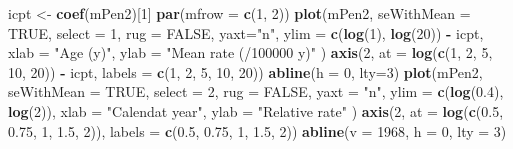 \documentclass[
]{book}
\newenvironment{Shaded}{\begin{snugshade}}{\end{snugshade}}
\newcommand{\AttributeTok}[1]{\textcolor[rgb]{0.13,0.29,0.53}{#1}}
\newcommand{\ConstantTok}[1]{\textcolor[rgb]{0.56,0.35,0.01}{#1}}
\newcommand{\DecValTok}[1]{\textcolor[rgb]{0.00,0.00,0.81}{#1}}
\newcommand{\FloatTok}[1]{\textcolor[rgb]{0.00,0.00,0.81}{#1}}
\newcommand{\FunctionTok}[1]{\textcolor[rgb]{0.13,0.29,0.53}{\textbf{#1}}}
\newcommand{\NormalTok}[1]{#1}
\newcommand{\OtherTok}[1]{\textcolor[rgb]{0.56,0.35,0.01}{#1}}
\newcommand{\SpecialCharTok}[1]{\textcolor[rgb]{0.81,0.36,0.00}{\textbf{#1}}}
\newcommand{\StringTok}[1]{\textcolor[rgb]{0.31,0.60,0.02}{#1}}
\begin{document}
\begin{Shaded}
\begin{Highlighting}[]
\NormalTok{icpt }\OtherTok{\textless{}{-}} \FunctionTok{coef}\NormalTok{(mPen2)[}\DecValTok{1}\NormalTok{]}
\FunctionTok{par}\NormalTok{(}\AttributeTok{mfrow =} \FunctionTok{c}\NormalTok{(}\DecValTok{1}\NormalTok{, }\DecValTok{2}\NormalTok{))}
\FunctionTok{plot}\NormalTok{(mPen2, }
  \AttributeTok{seWithMean =} \ConstantTok{TRUE}\NormalTok{, }\AttributeTok{select =} \DecValTok{1}\NormalTok{, }\AttributeTok{rug =} \ConstantTok{FALSE}\NormalTok{,}
  \AttributeTok{yaxt=}\StringTok{"n"}\NormalTok{,  }\AttributeTok{ylim =} \FunctionTok{c}\NormalTok{(}\FunctionTok{log}\NormalTok{(}\DecValTok{1}\NormalTok{), }\FunctionTok{log}\NormalTok{(}\DecValTok{20}\NormalTok{)) }\SpecialCharTok{{-}}\NormalTok{ icpt,}
  \AttributeTok{xlab =} \StringTok{"Age (y)"}\NormalTok{, }\AttributeTok{ylab =} \StringTok{"Mean rate (/100000 y)"}
\NormalTok{)}
\FunctionTok{axis}\NormalTok{(}\DecValTok{2}\NormalTok{, }\AttributeTok{at =} \FunctionTok{log}\NormalTok{(}\FunctionTok{c}\NormalTok{(}\DecValTok{1}\NormalTok{, }\DecValTok{2}\NormalTok{, }\DecValTok{5}\NormalTok{, }\DecValTok{10}\NormalTok{, }\DecValTok{20}\NormalTok{)) }\SpecialCharTok{{-}}\NormalTok{ icpt, }
     \AttributeTok{labels =} \FunctionTok{c}\NormalTok{(}\DecValTok{1}\NormalTok{, }\DecValTok{2}\NormalTok{, }\DecValTok{5}\NormalTok{, }\DecValTok{10}\NormalTok{, }\DecValTok{20}\NormalTok{))}
\FunctionTok{abline}\NormalTok{(}\AttributeTok{h =} \DecValTok{0}\NormalTok{, }\AttributeTok{lty=}\DecValTok{3}\NormalTok{)}
\FunctionTok{plot}\NormalTok{(mPen2,}
  \AttributeTok{seWithMean =} \ConstantTok{TRUE}\NormalTok{, }\AttributeTok{select =} \DecValTok{2}\NormalTok{, }\AttributeTok{rug =} \ConstantTok{FALSE}\NormalTok{,}
  \AttributeTok{yaxt =} \StringTok{"n"}\NormalTok{, }\AttributeTok{ylim =} \FunctionTok{c}\NormalTok{(}\FunctionTok{log}\NormalTok{(}\FloatTok{0.4}\NormalTok{), }\FunctionTok{log}\NormalTok{(}\DecValTok{2}\NormalTok{)),}
  \AttributeTok{xlab =} \StringTok{"Calendat year"}\NormalTok{, }\AttributeTok{ylab =} \StringTok{"Relative rate"}
\NormalTok{)}
\FunctionTok{axis}\NormalTok{(}\DecValTok{2}\NormalTok{, }\AttributeTok{at =} \FunctionTok{log}\NormalTok{(}\FunctionTok{c}\NormalTok{(}\FloatTok{0.5}\NormalTok{, }\FloatTok{0.75}\NormalTok{, }\DecValTok{1}\NormalTok{, }\FloatTok{1.5}\NormalTok{, }\DecValTok{2}\NormalTok{)), }
     \AttributeTok{labels =} \FunctionTok{c}\NormalTok{(}\FloatTok{0.5}\NormalTok{, }\FloatTok{0.75}\NormalTok{, }\DecValTok{1}\NormalTok{, }\FloatTok{1.5}\NormalTok{, }\DecValTok{2}\NormalTok{))}
\FunctionTok{abline}\NormalTok{(}\AttributeTok{v =} \DecValTok{1968}\NormalTok{, }\AttributeTok{h =} \DecValTok{0}\NormalTok{, }\AttributeTok{lty =} \DecValTok{3}\NormalTok{)}
\end{Highlighting}
\end{Shaded}
\end{document}
